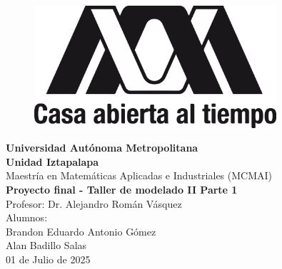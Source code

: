 \documentclass{article}
\begin{document}
	
	
	\begin{titlepage}
		
		\begin{figure}[H]
			\centering
			\includegraphics[width=0.8\textwidth]{uami1.png}  
		\end{figure}
		
		\begin{center}
			\LARGE \textbf{Universidad Autónoma Metropolitana} \\[0pt]
			\LARGE \textbf{Unidad Iztapalapa} \\[24pt]
			
			\Large Maestría en Matemáticas Aplicadas e Industriales (MCMAI) \\[24pt]
			
			\Large \textbf{Proyecto final - Taller de modelado II Parte 1} \\[12pt]
			

			Profesor: Dr. Alejandro Román Vásquez \\[8pt]
			Alumnos:\\[12pt]
			\qquad Brandon Eduardo Antonio Gómez \\[6pt]
			\qquad Alan Badillo Salas \\[64pt]
			\large 01 de Julio de 2025 \\[24pt]
			
		\end{center}
	\end{titlepage}
	
	
	\newpage
	\tableofcontents  
	\newpage
	
	
	
	
\end{document}
